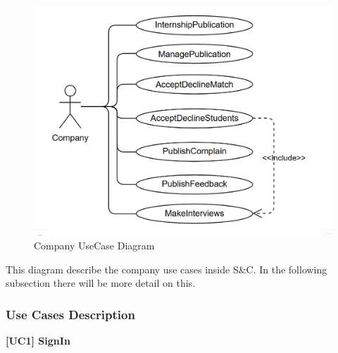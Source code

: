 \documentclass{article}
\begin{document}
\begin{figure}[H]
    \centering
    \includegraphics[width=0.5\linewidth]{CompanyUseCases.png}
    \caption{Company UseCase Diagram}
    \label{fig:enter-label}
\end{figure}
This diagram describe the company use cases inside S\&C. In the following subsection there will be more detail on this.

\subsubsection{Use Cases Description}
\textbf{[UC1] SignIn}
\end{document}

